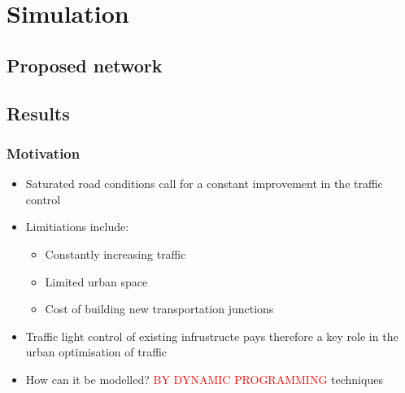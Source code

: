 \documentclass{beamer}
\begin{document}
\section{Simulation} %
\subsection{Proposed network} %
\subsection{Results} %

\begin{frame}
\frametitle{Motivation}
\begin{itemize}
\item Saturated road conditions call for a constant improvement in the traffic control
\item Limitiations include:
 \begin{itemize}
\item Constantly increasing traffic
\item Limited urban space
\item Cost of building new transportation junctions
\end{itemize}

\item Traffic light control of existing infrustructe pays therefore a key role in the urban optimisation of traffic
\item How can it be modelled? \textcolor{red}{BY DYNAMIC PROGRAMMING} techniques

\end{itemize}



\end{frame}
\end{document}
